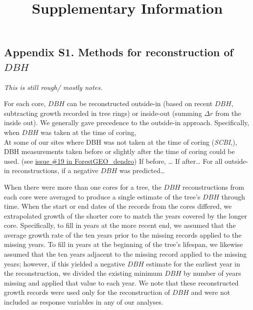 \documentclass[
]{article}
\title{Supplementary Information}
\author{}
\date{\vspace{-2.5em}}
\begin{document}
\maketitle

{
\setcounter{tocdepth}{3}
\tableofcontents
}
\newpage

\hypertarget{appendix-s1.-methods-for-reconstruction-of-dbh}{%
\subsection{\texorpdfstring{Appendix S1. Methods for reconstruction of
\(DBH\)}{Appendix S1. Methods for reconstruction of DBH}}\label{appendix-s1.-methods-for-reconstruction-of-dbh}}

\emph{This is still rough/ mostly notes.}

For each core, \(DBH\) can be reconstructed outside-in (based on recent
\(DBH\), subtracting growth recorded in tree rings) or inside-out
(summing \(\Delta r\) from the inside out). We generally gave precedence
to the outside-in approach. Specifically, when \(DBH\) was taken at the
time of coring,\\
At some of our sites where DBH was not taken at the time of coring
(\emph{SCBI},), DBH measurements taken before or slightly after the time
of coring could be used. (see
\href{https://github.com/EcoClimLab/ForestGEO_dendro/issues/19}{issue
\#19 in ForestGEO\_dendro}) If before, \ldots{} If after\ldots{} For all
outside-in reconstructions, if a negative \(DBH\) was predicted\ldots{}

When there were more than one cores for a tree, the \(DBH\)
reconstructions from each core were averaged to produce a single
estimate of the tree's \(DBH\) through time. When the start or end dates
of the records from the cores differed, we extrapolated growth of the
shorter core to match the years covered by the longer core.
Specifically, to fill in years at the more recent end, we assumed that
the average growth rate of the ten years prior to the missing records
applied to the missing years. To fill in years at the beginning of the
tree's lifespan, we likewise assumed that the ten years adjacent to the
missing record applied to the missing years; however, if this yielded a
negative \(DBH\) estimate for the earliest year in the reconstruction,
we divided the existing minimum \(DBH\) by number of years missing and
applied that value to each year. We note that these reconstructed growth
records were used only for the reconstruction of \(DBH\) and were not
included as response variables in any of our analyses.
\end{document}
